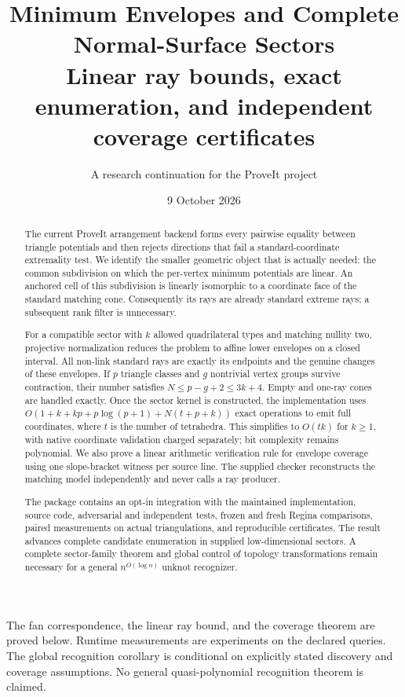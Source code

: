 \documentclass[11pt]{article}
\title{\vspace{-1.0cm}\textbf{Minimum Envelopes and Complete\\Normal-Surface Sectors}\\[0.35em]
\large Linear ray bounds, exact enumeration, and independent coverage certificates}
\author{A research continuation for the ProveIt project}
\date{9 October 2026}
\theoremstyle{definition}
\theoremstyle{remark}
\begin{document}
\maketitle
\begin{abstract}
The current ProveIt arrangement backend forms every pairwise equality between
triangle potentials and then rejects directions that fail a standard-coordinate
extremality test. We identify the smaller geometric object that is actually
needed: the common subdivision on which the per-vertex minimum potentials are
linear. An anchored cell of this subdivision is linearly isomorphic to a
coordinate face of the standard matching cone. Consequently its rays are
already standard extreme rays; a subsequent rank filter is unnecessary.

For a compatible sector with $k$ allowed quadrilateral types and matching
nullity two, projective normalization reduces the problem to affine lower
envelopes on a closed interval. All non-link standard rays are exactly its
endpoints and the genuine changes of these envelopes. If $p$ triangle classes
and $g$ nontrivial vertex groups survive contraction, their number satisfies
$N\le p-g+2\le 3k+4$. Empty and one-ray cones are handled exactly. Once the
sector kernel is constructed, the implementation uses
$O(1+k+kp+p\log(p+1)+N(t+p+k))$ exact operations to emit full coordinates,
where $t$ is the number of tetrahedra. This simplifies to $O(tk)$ for
$k\ge1$, with native coordinate validation charged separately; bit
complexity remains polynomial. We also prove a linear arithmetic
verification rule for envelope coverage using one slope-bracket witness per
source line. The supplied checker reconstructs the matching model independently
and never calls a ray producer.

The package contains an opt-in integration with the maintained implementation,
source code, adversarial and independent tests, frozen and fresh Regina
comparisons, paired measurements on actual triangulations, and reproducible
certificates. The result advances complete candidate enumeration in supplied
low-dimensional sectors. A complete sector-family theorem and global control
of topology transformations remain necessary for a general
$n^{O(\log n)}$ unknot recognizer.
\end{abstract}

\begin{tcolorbox}[colback=MidnightBlue!4,colframe=MidnightBlue!45,
 title={Reading the claims}]
The fan correspondence, the linear ray bound, and the coverage theorem are
proved below. Runtime measurements are experiments on the declared queries.
The global recognition corollary is conditional on explicitly stated discovery
and coverage assumptions. No general quasi-polynomial recognition theorem is
claimed.
\end{tcolorbox}
\clearpage
\tableofcontents
\newpage
\end{document}
